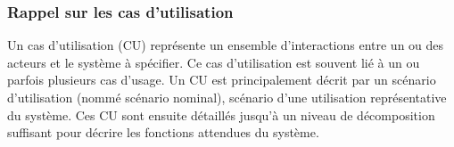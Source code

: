 \subsubsection{Rappel sur les cas d'utilisation}
\medskip
Un cas d'utilisation (CU) représente un ensemble d'interactions entre un ou des acteurs et le système à spécifier. Ce cas d'utilisation est souvent lié à un ou parfois plusieurs cas d'usage. Un CU est principalement décrit par un scénario d'utilisation (nommé scénario nominal), scénario d'une utilisation représentative du système. Ces CU sont ensuite détaillés jusqu'à un niveau de décomposition suffisant pour décrire les fonctions attendues du système. 
\medskip